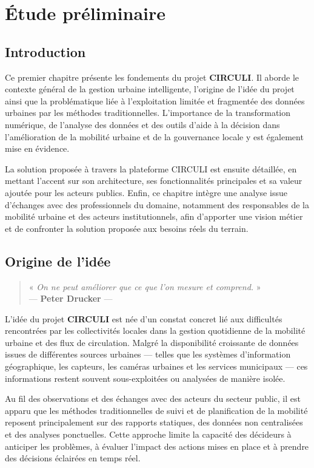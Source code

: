 \chapter{Étude préliminaire}

\section{Introduction}
Ce premier chapitre présente les fondements du projet \textbf{CIRCULI}. Il aborde le contexte général de la gestion urbaine intelligente, l'origine de l'idée du projet ainsi que la problématique liée à l'exploitation limitée et fragmentée des données urbaines par les méthodes traditionnelles. L'importance de la transformation numérique, de l'analyse des données et des outils d'aide à la décision dans l'amélioration de la mobilité urbaine et de la gouvernance locale y est également mise en évidence.

La solution proposée à travers la plateforme CIRCULI est ensuite détaillée, en mettant l'accent sur son architecture, ses fonctionnalités principales et sa valeur ajoutée pour les acteurs publics. Enfin, ce chapitre intègre une analyse issue d'échanges avec des professionnels du domaine, notamment des responsables de la mobilité urbaine et des acteurs institutionnels, afin d'apporter une vision métier et de confronter la solution proposée aux besoins réels du terrain.

\section{Origine de l'idée}
\begin{quote}
« \textit{On ne peut améliorer que ce que l'on mesure et comprend.} »\\
--- \textbf{Peter Drucker} ---
\end{quote}

L'idée du projet \textbf{CIRCULI} est née d'un constat concret lié aux difficultés rencontrées par les collectivités locales dans la gestion quotidienne de la mobilité urbaine et des flux de circulation. Malgré la disponibilité croissante de données issues de différentes sources urbaines — telles que les systèmes d'information géographique, les capteurs, les caméras urbaines et les services municipaux — ces informations restent souvent sous-exploitées ou analysées de manière isolée.

Au fil des observations et des échanges avec des acteurs du secteur public, il est apparu que les méthodes traditionnelles de suivi et de planification de la mobilité reposent principalement sur des rapports statiques, des données non centralisées et des analyses ponctuelles. Cette approche limite la capacité des décideurs à anticiper les problèmes, à évaluer l'impact des actions mises en place et à prendre des décisions éclairées en temps réel.

